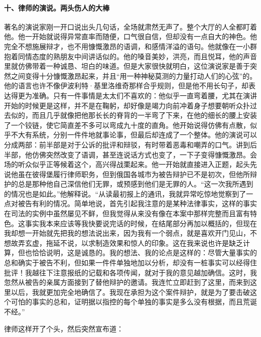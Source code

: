 \paragraph*{十、律师的演说。两头伤人的大棒}
\par 著名的演说家刚一开口说出头几句话，全场就肃然无声了。整个大厅的人全都盯着他。他一开始就说得异常直率而随便，口气很自信，但却没有一点自大的神色。他完全不想施展辩才，也不用慷慨激昂的语调，和感情洋溢的语句。他就像在一小群抱着同情态度的熟朋友中间讲话似的。他的嗓音美妙，洪亮，而且悦耳，他的声音里就仿佛带着一种诚恳、坦白的味道。但是大家很快就明白，这位演说家是善于突然之间变得十分慷慨激昂起来，并且“用一种神秘莫测的力量打动人们的心弦”的。他的语言也许不像伊波利特·基里洛维奇那样合乎规则，但是他不用长句子，却表达得更为准确。只有一件事情是太太们不喜欢的：他似乎一直弯着腰，尤其在演讲开始的时候更是这样，并不是在鞠躬，却好像是竭力向前冲着身子想要朝听众扑过去似的，而且几乎就像把他那长长的脊背的一半弯了下来，在他的细长的腰上安装了一个铰链，使它简直差不多可以弯成九十度的直角。他开始说得仿佛有点散，似乎不大有系统，分别一件件地就事论事，但最后却连成了一个整体。他的演说可以分成两部：前半部是对于公诉的批评和辩驳，有时带着恶毒和嘲弄的口气。讲到后半部，他仿佛突然改变了语调，甚至连说话方式也变了，一下子变得慷慨激昂。会场的听众似乎正等候着这个，高兴得战栗起来。他一开始就直接进入正题，起头先说他虽在彼得堡履行律师职务，但到俄国各城市为被告辩护已不是初次，但他所辩护的总是那种他自己深信他们无罪，或预感到他们是无罪的人。“这一次我所遇到的情况也是如此。”他解释说。“从读最初报上的通讯，我就异常吃惊地觉察到了一点对被告有利的情况。简单地说，首先引起我注意的是某种法律事实，这样的事实在司法的实例中虽然屡见不鲜，但我觉得从来没有像在本案中那样完整而且富有特色。这事实我本来应该等我快要说完话的时候，在结尾部分再加以概括的，但现在我却想一开始就先把我的想法说出来，因为我有一个弱点，就是喜欢开门见山，不想故弄玄虚，拖延不说，以求制造效果和惊人的印象。这在我来说也许是缺乏计算，但也恰恰说明，这是诚恳的。我的想法、我的论点是这样的：尽管大量事实的总和确实于被告不利，但如果一件件单独地加以分析，却没有一桩事实可以经得住批评！我越往下注意报纸的记载和各项传闻，就对于我的意见越加确信。这时，我忽然从被告的亲属方面接到了替他辩护的邀请。我连忙立即赶到了这里，而来到这里以后，我就更加完全地确信了。我现在承担为这个案件辩护，就是为了要击破这个可怕的事实的总和，证明据以指控的每个单独的事实是多么没有根据，而且荒诞不经。”
\par 律师这样开了个头，然后突然宣布道：
